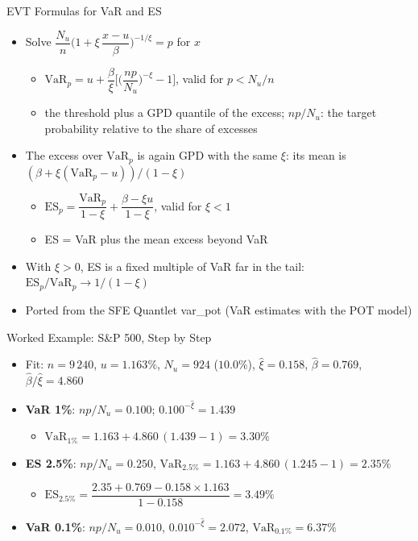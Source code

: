 \begin{frame}{EVT Formulas for VaR and ES}
\itemsize{\small}
\begin{itemize}
    \item Solve $\dfrac{N_u}{n}\Big(1 + \xi\,\dfrac{x - u}{\beta}\Big)^{-1/\xi} = p$ for $x$
    \begin{itemize}
        \item $\mathrm{VaR}_p = u + \dfrac{\beta}{\xi}\Big[\Big(\dfrac{n p}{N_u}\Big)^{-\xi} - 1\Big]$, valid for $p < N_u/n$
        \item the threshold plus a GPD quantile of the excess; $np/N_u$: the target probability relative to the share of excesses
    \end{itemize}
    \item The excess over $\mathrm{VaR}_p$ is again GPD with the same $\xi$: its mean is $(\beta + \xi(\mathrm{VaR}_p - u))/(1 - \xi)$
    \begin{itemize}
        \item $\mathrm{ES}_p = \dfrac{\mathrm{VaR}_p}{1 - \xi} + \dfrac{\beta - \xi u}{1 - \xi}$, valid for $\xi < 1$ 
        \item ES = VaR plus the mean excess beyond VaR
    \end{itemize}
    \item With $\xi > 0$, ES is a fixed multiple of VaR far in the tail: $\mathrm{ES}_p/\mathrm{VaR}_p \to 1/(1 - \xi)$
    \item Ported from the SFE Quantlet var\_pot (VaR estimates with the POT model)
\end{itemize}
\end{frame}

\begin{frame}{Worked Example: S\&P 500, Step by Step}
\itemsize{\small}
\begin{itemize}
    \item Fit: $n = 9\,240$, $u = 1.163\%$, $N_u = 924$ ($10.0\%$), $\hat\xi = 0.158$, $\hat\beta = 0.769$, $\hat\beta/\hat\xi = 4.860$
    \item \textbf{VaR 1\%}: $np/N_u = 0.100$; $0.100^{-\hat\xi} = 1.439$
    \begin{itemize}
        \item $\mathrm{VaR}_{1\%} = 1.163 + 4.860\,(1.439 - 1) = 3.30\%$
    \end{itemize}
    \item \textbf{ES 2.5\%}: $np/N_u = 0.250$, $\mathrm{VaR}_{2.5\%} = 1.163 + 4.860\,(1.245 - 1) = 2.35\%$
    \begin{itemize}
        \item $\mathrm{ES}_{2.5\%} = \dfrac{2.35 + 0.769 - 0.158 \times 1.163}{1 - 0.158} = 3.49\%$
    \end{itemize}
    \item \textbf{VaR 0.1\%}: $np/N_u = 0.010$, $0.010^{-\hat\xi} = 2.072$, $\mathrm{VaR}_{0.1\%} = 6.37\%$
\end{itemize}
\end{frame}

